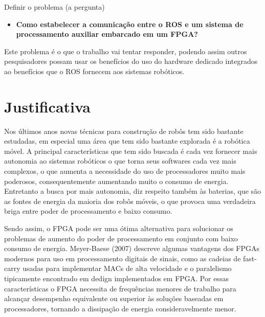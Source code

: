 Definir o problema (a pergunta)

\begin{itemize}
    \item \textbf{Como estabelecer a comunicação entre o ROS e um sistema de processamento auxiliar 
embarcado em um FPGA?}

\end{itemize}

Este problema é o que o trabalho vai tentar responder, podendo assim outros pesquisadores possam usar 
os benefícios do uso do hardware dedicado integrados ao benefícios que o ROS fornecem aos sistemas 
robóticos.






  








\section{Justificativa}

Nos últimos anos novas técnicas para construção de robôs tem sido bastante estudadas, em 
especial uma área que tem sido bastante explorada é a robótica móvel. A principal 
características que tem sido buscada é cada vez fornecer mais autonomia ao sistemas 
robóticos o que torna seus softwares cada vez mais complexos, o que aumenta a 
necessidade do uso de processadores muito mais poderosos, consequentemente aumentando
muito o consumo de energia. Entretanto a busca por mais autonomia, diz respeito também às 
baterias, que são as fontes de energia da maioria dos robôs móveis, o que provoca uma 
verdadeira briga entre poder de processamento e baixo consumo.

Sendo assim, o FPGA pode ser uma ótima alternativa para solucionar os problemas de aumento 
do poder de processamento em conjunto com baixo consumo de energia. Meyer-Baese (2007) 
descreve algumas vantagens dos FPGAs modernos para uso em processamento digitais de 
sinais, como as cadeias de fast-carry usadas para implementar MACs de alta velocidade e o 
paralelismo tipicamente encontrado em dedign implementados em FPGA. Por essas 
características o FPGA necessita de frequências menores de trabalho para alcançar 
desempenho equivalente ou superior às soluções baseadas em processadores, tornando a 
dissipação de energia consideravelmente menor.

